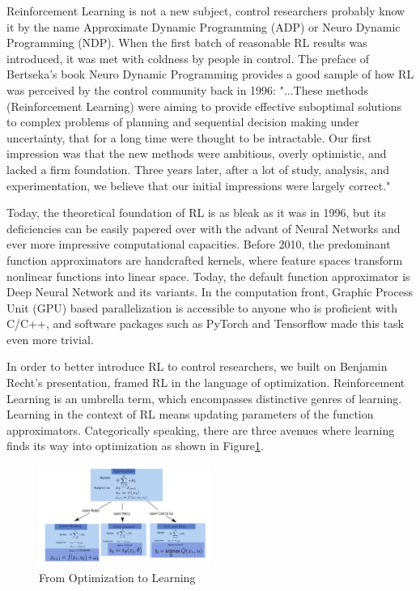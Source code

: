 \documentclass[journal]{IEEEtran}
\begin{document}
Reinforcement Learning is not a new subject, control researchers probably know it by the name Approximate Dynamic Programming (ADP) or Neuro Dynamic Programming (NDP). When the first batch of reasonable RL results was introduced, it was met with coldness by people in control. The preface of Bertseka's book Neuro Dynamic Programming provides a good sample of how RL was perceived by the control community back in 1996: "...These methods (Reinforcement Learning) were aiming to provide effective suboptimal solutions to complex problems of planning and sequential decision making under uncertainty, that for a long time were thought to be intractable. Our first impression was that the new methods were ambitious, overly optimistic, and lacked a firm foundation. Three years later, after a lot of study, analysis, and experimentation, we believe that our initial impressions were largely correct." \cite{Bertsekas1996NeuroDynamicP}

Today, the theoretical foundation of RL is as bleak as it was in 1996, but its deficiencies can be easily papered over with the advant of Neural Networks and ever more impressive computational capacities. Before 2010, the predominant function approximators are handcrafted kernels, where feature spaces transform nonlinear functions into linear space. Today, the default function approximator is Deep Neural Network and its variants. In the computation front, Graphic Process Unit (GPU) based parallelization is accessible to anyone who is proficient with C/C++\cite{Nickolls2008ScalablePP}, and software packages such as PyTorch\cite{Paszke2017AutomaticDI} and Tensorflow\cite{Abadi2016TensorFlowAS} made this task even more trivial.

In order to better introduce RL to control researchers, we built on Benjamin Recht's presentation\cite{Recht2018ATO}, framed RL in the language of optimization. Reinforcement Learning is an umbrella term, which encompasses distinctive genres of learning. Learning in the context of RL means updating parameters of the function approximators. Categorically speaking, there are three avenues where learning finds its way into optimization as shown in Figure\ref{fig:1}. 
\begin{figure}
    \centering
    \includegraphics[width=0.5\textwidth]{Control.png}
    \caption{From Optimization to Learning}
    \label{fig:1}
\end{figure}
\end{document}
